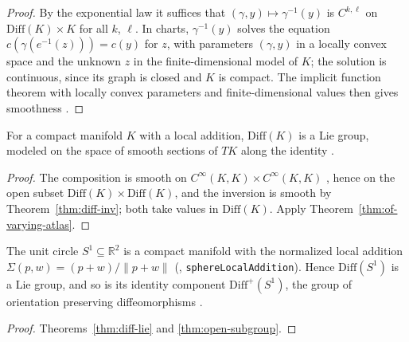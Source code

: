 \begin{proof}
  \leanok
  By the exponential law it suffices that $(\gamma, y) \mapsto \gamma^{-1}(y)$ is $C^{k,\ell}$ on
  $\mathrm{Diff}(K) \times K$ for all $k$, $\ell$. In charts, $\gamma^{-1}(y)$ solves the equation
  $c(\gamma(e^{-1}(z))) = c(y)$ for $z$, with parameters $(\gamma, y)$ in a locally convex space
  and the unknown $z$ in the finite-dimensional model of $K$; the solution is continuous, since
  its graph is closed and $K$ is compact. The implicit function theorem with locally convex
  parameters and finite-dimensional values \cite{LCA} then gives smoothness
  \cite[Lemma 13.1.8]{GN26}.
\end{proof}

\begin{theorem}
  \label{thm:diff-lie}
  \leanok
  For a compact manifold $K$ with a local addition, $\mathrm{Diff}(K)$ is a Lie group, modeled on
  the space of smooth sections of $TK$ along the identity \cite[Proposition 13.1.10(e)]{GN26}.
\end{theorem}

\begin{proof}
  \leanok
  The composition is smooth on $C^\infty(K, K) \times C^\infty(K, K)$
  \cite[Proposition 13.1.2(a)]{GN26}, hence on the open subset $\mathrm{Diff}(K) \times
  \mathrm{Diff}(K)$, and the inversion is smooth by Theorem~\ref{thm:diff-inv}; both take values in
  $\mathrm{Diff}(K)$. Apply Theorem~\ref{thm:of-varying-atlas}.
\end{proof}

\begin{corollary}
  \label{cor:diff-circle}
  \leanok
  The unit circle $S^1 \subseteq \mathbb{R}^2$ is a compact manifold with the normalized local
  addition $\Sigma(p, w) = (p + w)/\|p + w\|$ (\cite{LCM}, \texttt{sphereLocalAddition}). Hence
  $\mathrm{Diff}(S^1)$ is a Lie group, and so is its identity component $\mathrm{Diff}^+(S^1)$,
  the group of orientation preserving diffeomorphisms \cite[\S 13.3]{GN26}.
\end{corollary}

\begin{proof}
  \leanok
  Theorems~\ref{thm:diff-lie} and \ref{thm:open-subgroup}.
\end{proof}

